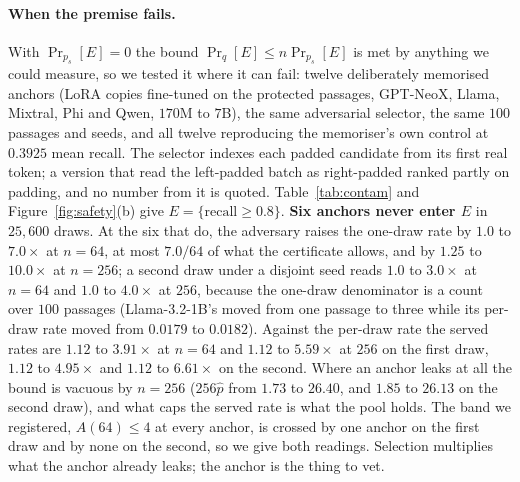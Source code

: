 \paragraph{When the premise fails.}\label{app:contaminated}\label{app:sel-contaminated}
With $\Pr_{p_s}[E] = 0$ the bound $\Pr_q[E] \le n \Pr_{p_s}[E]$ is met by anything we could measure, so
we tested it where it can fail: twelve deliberately memorised anchors (LoRA copies fine-tuned on the
protected passages, GPT-NeoX, Llama, Mixtral, Phi and Qwen, $170$M to $7$B), the same adversarial
selector, the same $100$ passages and seeds, and all twelve reproducing the memoriser's own control at
$0.3925$ mean recall. The selector indexes each padded candidate from its first real token; a version
that read the left-padded batch as right-padded ranked partly on padding, and no number from it is
quoted. Table~\ref{tab:contam} and Figure~\ref{fig:safety}(b) give $E = \{\text{recall} \ge 0.8\}$.
\textbf{Six anchors never enter $E$} in $25{,}600$ draws. At the six that do, the adversary raises the
one-draw rate by $1.0$ to $7.0\times$ at $n=64$, at most $7.0/64$ of what the certificate allows, and by
$1.25$ to $10.0\times$ at $n=256$; a second draw under a disjoint seed reads $1.0$ to $3.0\times$ at $n=64$ and $1.0$ to $4.0\times$ at $256$, because the one-draw denominator is a count over $100$ passages (Llama-3.2-1B's moved
from one passage to three while its per-draw rate moved from $0.0179$ to $0.0182$). Against the per-draw rate the served rates are $1.12$ to $3.91\times$ at $n=64$ and $1.12$ to $5.59\times$ at $256$ on the first draw, $1.12$ to $4.95\times$ and $1.12$ to $6.61\times$ on the second. Where an anchor leaks
at all the bound is vacuous by $n=256$ ($256\hat p$ from $1.73$ to $26.40$, and $1.85$ to $26.13$ on the second draw), and what caps the served
rate is what the pool holds. The band we registered, $A(64) \le 4$ at every anchor, is crossed by one
anchor on the first draw and by none on the second, so we give both readings. Selection multiplies what
the anchor already leaks; the anchor is the thing to vet.


